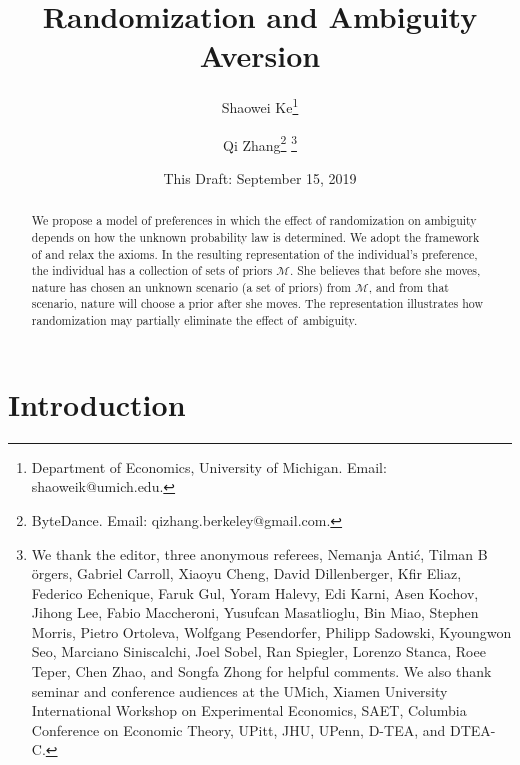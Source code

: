 \documentclass[12pt, notitlepage]{article}
\begin{document}
\title{Randomization and Ambiguity Aversion}
\date{This Draft: September 15, 2019}
\author{Shaowei Ke\thanks{%
Department of Economics, University of Michigan. Email: shaoweik@umich.edu.}
\and Qi Zhang\thanks{%
ByteDance. Email: qizhang.berkeley@gmail.com.} \thanks{%
We thank the editor, three anonymous referees, Nemanja Anti\'{c}, Tilman B%
\"{o}rgers, Gabriel Carroll, Xiaoyu Cheng, David Dillenberger, Kfir Eliaz,
Federico Echenique, Faruk Gul, Yoram Halevy, Edi Karni, Asen Kochov, Jihong
Lee, Fabio Maccheroni, Yusufcan Masatlioglu, Bin Miao, Stephen Morris,
Pietro Ortoleva, Wolfgang Pesendorfer, Philipp Sadowski, Kyoungwon Seo,
Marciano Siniscalchi, Joel Sobel, Ran Spiegler, Lorenzo Stanca, Roee Teper,
Chen Zhao, and Songfa Zhong for helpful comments. We also thank seminar and
conference audiences at the UMich, Xiamen University International Workshop
on Experimental Economics, SAET, Columbia Conference on Economic Theory,
UPitt, JHU, UPenn, D-TEA, and DTEA-C.}}
\maketitle

\begin{abstract}
We propose a model of preferences in which the effect of randomization on
ambiguity depends on how the unknown probability law is determined. We adopt
the framework of \cite{AA63} and relax the axioms. In the resulting
representation of the individual's preference, the individual has a
collection of sets of priors $\mathcal{M}$. She believes that before she
moves, nature has chosen an unknown scenario (a set of priors) from $%
\mathcal{M}$, and from that scenario, nature will choose a prior after she
moves. The representation illustrates how randomization may partially
eliminate the effect of\ ambiguity.
\end{abstract}

\vskip1cm

\thispagestyle{empty}

\clearpage

\setcounter{page}{1}

\section{Introduction}
\end{document}
